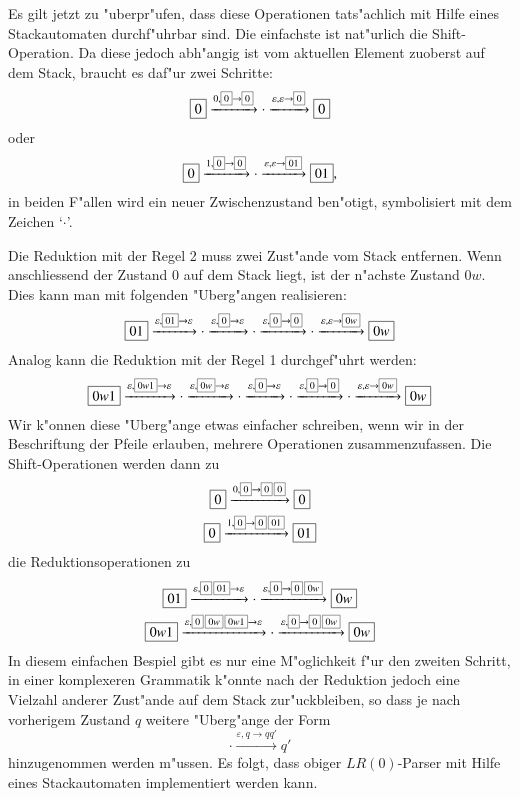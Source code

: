 Es gilt jetzt zu "uberpr"ufen, dass diese Operationen tats"achlich mit
Hilfe eines Stackautomaten durchf"uhrbar sind. Die einfachste ist nat"urlich
die Shift-Ope\-ration. Da diese jedoch abh"angig ist vom aktuellen Element zuoberst
auf dem Stack, braucht es daf"ur zwei Schritte:
\[
\boxed{0}\xrightarrow{0,\scalebox{0.7}{\boxed{0}$\rightarrow$\boxed{0}}}\cdot
\xrightarrow{\varepsilon,\varepsilon\rightarrow\scalebox{0.7}{\boxed{0}}}\boxed{0}
\]
oder
\[
\boxed{0}\xrightarrow{1,\scalebox{0.7}{\boxed{0}$\rightarrow$\boxed{0}}}\cdot
\xrightarrow{\varepsilon,\varepsilon\rightarrow\scalebox{0.7}{\boxed{01}}}\boxed{01},
\]
in beiden F"allen wird ein neuer Zwischenzustand ben"otigt, symbolisiert mit dem Zeichen
`$\cdot$'.

Die Reduktion mit der Regel 2 muss zwei Zust"ande vom Stack entfernen.
Wenn anschliessend der Zustand $\boxed{0}$ auf dem Stack liegt, ist der
n"achste Zustand $\boxed{0w}$. Dies kann man mit folgenden "Uberg"angen
realisieren:
\[
\boxed{01}
\xrightarrow{\varepsilon,\scalebox{0.7}{\boxed{01}}\to\varepsilon}
\cdot
\xrightarrow{\varepsilon,\scalebox{0.7}{\boxed{0}}\to\varepsilon}
\cdot
\xrightarrow{\varepsilon,\scalebox{0.7}{\boxed{0}}\to\scalebox{0.7}{\boxed{0}}}
\cdot
\xrightarrow{\varepsilon,\varepsilon\to\scalebox{0.7}{\boxed{0w}}}
\boxed{0w}
\]
Analog kann die Reduktion mit der Regel 1 durchgef"uhrt werden:
\[
\boxed{0w1}
\xrightarrow{\varepsilon,\scalebox{0.7}{\boxed{0w1}}\to\varepsilon}
\cdot
\xrightarrow{\varepsilon,\scalebox{0.7}{\boxed{0w}}\to\varepsilon}
\cdot
\xrightarrow{\varepsilon,\scalebox{0.7}{\boxed{0}}\to\varepsilon}
\cdot
\xrightarrow{\varepsilon,\scalebox{0.7}{\boxed{0}}\to\scalebox{0.7}{\boxed{0}}}
\cdot
\xrightarrow{\varepsilon,\varepsilon\to\scalebox{0.7}{\boxed{0w}}}
\boxed{0w}
\]
Wir k"onnen diese "Uberg"ange etwas einfacher schreiben, wenn wir in der
Beschriftung der Pfeile erlauben, mehrere Operationen zusammenzufassen.
Die Shift-Ope\-rationen werden dann zu
\begin{gather*}
\boxed{0}\xrightarrow{0,\scalebox{0.7}{\boxed{0}$\rightarrow$\boxed{0}\,\boxed{0}}}\boxed{0}
\\
\boxed{0}\xrightarrow{1,\scalebox{0.7}{\boxed{0}$\rightarrow$\boxed{0}\,\boxed{01}}}\boxed{01}
\end{gather*}
die Reduktionsoperationen zu
\begin{gather*}
\boxed{01}
\xrightarrow{\varepsilon,\scalebox{0.7}{\boxed{0}\,\boxed{01}}\to\varepsilon}
\cdot
\xrightarrow{\varepsilon,\scalebox{0.7}{\boxed{0}}\to\scalebox{0.7}{\boxed{0}\,\boxed{0w}}}
\boxed{0w}
\\
\boxed{0w1}
\xrightarrow{\varepsilon,\scalebox{0.7}{\boxed{0}\,\boxed{0w}\,\boxed{0w1}}\to\varepsilon}
\cdot
\xrightarrow{\varepsilon,\scalebox{0.7}{\boxed{0}}\to\scalebox{0.7}{\boxed{0}\,\boxed{0w}}}
\boxed{0w}
\end{gather*}
In diesem einfachen Bespiel gibt es nur eine M"oglichkeit f"ur den zweiten
Schritt, in einer komplexeren Grammatik k"onnte nach der Reduktion jedoch
eine Vielzahl anderer Zust"ande auf dem Stack zur"uckbleiben, so dass je
nach vorherigem Zustand $q$ weitere "Uberg"ange der Form
\[
\cdot\xrightarrow{\varepsilon,q\to q q'}q'
\]
hinzugenommen werden m"ussen. Es folgt, dass obiger $LR(0)$-Parser mit
Hilfe eines Stackautomaten implementiert werden kann.

